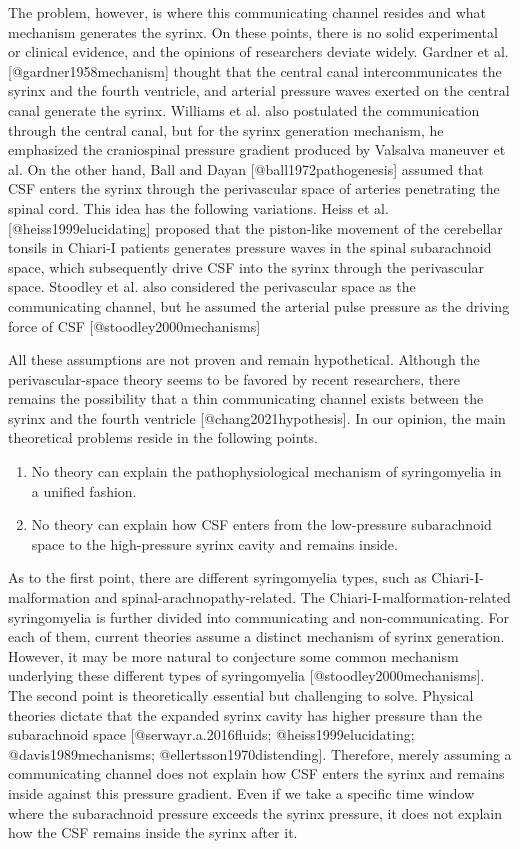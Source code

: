\documentclass[fleqn,10pt]{wlscirep}
\begin{document}
The problem, however, is where this communicating channel resides and what
mechanism generates the syrinx. On these points, there is no solid
experimental or clinical evidence, and the opinions of researchers deviate
widely. Gardner et al. [@gardner1958mechanism] thought that the central
canal intercommunicates the syrinx and the fourth ventricle, and arterial
pressure waves exerted on the central canal generate the syrinx. Williams
et al. also postulated the communication through the central canal, but for
the syrinx generation mechanism, he emphasized the craniospinal pressure
gradient produced by Valsalva maneuver et al.  On the other hand, Ball and
Dayan [@ball1972pathogenesis] assumed that CSF enters the syrinx through
the perivascular space of arteries penetrating the spinal cord. This idea
has the following variations. Heiss et al. [@heiss1999elucidating] proposed
that the piston-like movement of the cerebellar tonsils in Chiari-I
patients generates pressure waves in the spinal subarachnoid space, which
subsequently drive CSF into the syrinx through the perivascular space.
Stoodley et al. also considered the perivascular space as the communicating
channel, but he assumed the arterial pulse pressure as the driving force of
CSF [@stoodley2000mechanisms]

All these assumptions are not proven and remain hypothetical. Although the
perivascular-space theory seems to be favored by recent researchers, there
remains the possibility that a thin communicating channel exists between
the syrinx and the fourth ventricle [@chang2021hypothesis].  In our
opinion, the main theoretical problems reside in the following points.
\begin{enumerate}
    \item No theory can explain the pathophysiological mechanism of syringomyelia in a unified fashion.
    \item No theory can explain how CSF enters from the low-pressure subarachnoid space to the high-pressure syrinx cavity and remains inside.
\end{enumerate}

As to the first point, there are different syringomyelia types, such as
Chiari-I-malformation and spinal-arachnopathy-related. The
Chiari-I-malformation-related syringomyelia is further divided into
communicating and non-communicating. For each of them, current theories
assume a distinct mechanism of syrinx generation. However, it may be more
natural to conjecture some common mechanism underlying these different
types of syringomyelia [@stoodley2000mechanisms].  The second point is
theoretically essential but challenging to solve. Physical theories dictate
that the expanded syrinx cavity has higher pressure than the subarachnoid
space [@serwayr.a.2016fluids; @heiss1999elucidating; @davis1989mechanisms;
@ellertsson1970distending]. Therefore, merely assuming a communicating
channel does not explain how CSF enters the syrinx and remains inside
against this pressure gradient. Even if we take a specific time window
where the subarachnoid pressure exceeds the syrinx pressure, it does not
explain how the CSF remains inside the syrinx after it.
\end{document}
